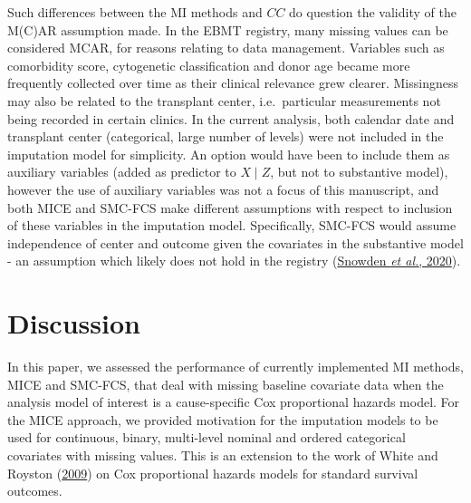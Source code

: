 \documentclass[
  letterpaper,
  DIV=11,
  numbers=noendperiod]{scrreprt}
\begin{document}
Such differences between the MI methods and \(CC\) do question the
validity of the M(C)AR assumption made. In the EBMT registry, many
missing values can be considered MCAR, for reasons relating to data
management. Variables such as comorbidity score, cytogenetic
classification and donor age became more frequently collected over time
as their clinical relevance grew clearer. Missingness may also be
related to the transplant center, i.e.~particular measurements not being
recorded in certain clinics. In the current analysis, both calendar date
and transplant center (categorical, large number of levels) were not
included in the imputation model for simplicity. An option would have
been to include them as auxiliary variables (added as predictor to
\(X \mid Z\), but not to substantive model), however the use of
auxiliary variables was not a focus of this manuscript, and both MICE
and SMC-FCS make different assumptions with respect to inclusion of
these variables in the imputation model. Specifically, SMC-FCS would
assume independence of center and outcome given the covariates in the
substantive model - an assumption which likely does not hold in the
registry
(\protect\hyperlink{ref-snowdenBenchmarkingSurvivalOutcomes2020}{Snowden
\emph{et al.}, 2020}).

\hypertarget{sec-discussion}{%
\section{Discussion}\label{sec-discussion}}

In this paper, we assessed the performance of currently implemented MI
methods, MICE and SMC-FCS, that deal with missing baseline covariate
data when the analysis model of interest is a cause-specific Cox
proportional hazards model. For the MICE approach, we provided
motivation for the imputation models to be used for continuous, binary,
multi-level nominal and ordered categorical covariates with missing
values. This is an extension to the work of White and Royston
(\protect\hyperlink{ref-whiteImputingMissingCovariate2009}{2009}) on Cox
proportional hazards models for standard survival outcomes.
\end{document}
